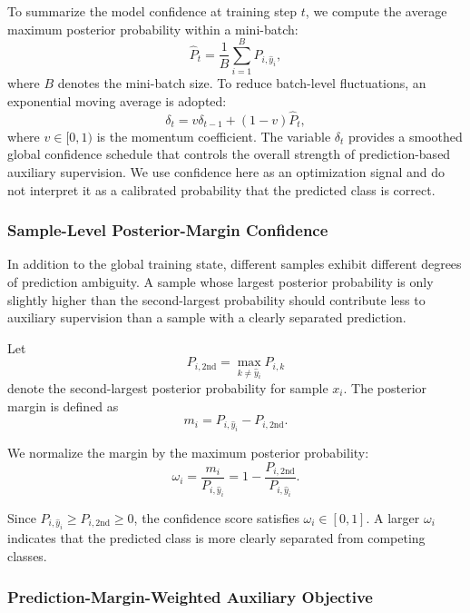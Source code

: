 \documentclass[journal]{IEEEtran}
\begin{document}
To summarize the model confidence at training step $t$, we compute the average maximum posterior probability within a mini-batch:
\begin{equation}
\hat{P}_t
=
\frac{1}{B}
\sum_{i=1}^{B}
P_{i,\hat{y}_i},
\end{equation}
where $B$ denotes the mini-batch size.
To reduce batch-level fluctuations, an exponential moving average is adopted:
\begin{equation}
\delta_t
=
v\delta_{t-1}
+
(1-v)\hat{P}_t,
\end{equation}
where $v\in[0,1)$ is the momentum coefficient.
The variable $\delta_t$ provides a smoothed global confidence schedule that controls the overall strength of prediction-based auxiliary supervision. We use confidence here as an optimization signal and do not interpret it as a calibrated probability that the predicted class is correct.

\subsubsection{Sample-Level Posterior-Margin Confidence}

In addition to the global training state, different samples exhibit different degrees of prediction ambiguity.
A sample whose largest posterior probability is only slightly higher than the second-largest probability should contribute less to auxiliary supervision than a sample with a clearly separated prediction.

Let
\begin{equation}
P_{i,\mathrm{2nd}}
=
\max_{k\neq\hat{y}_i}P_{i,k}
\end{equation}
denote the second-largest posterior probability for sample $x_i$.
The posterior margin is defined as
\begin{equation}
m_i
=
P_{i,\hat{y}_i}
-
P_{i,\mathrm{2nd}}.
\end{equation}

We normalize the margin by the maximum posterior probability:
\begin{equation}
\omega_i
=
\frac{m_i}{P_{i,\hat{y}_i}}
=
1-
\frac{P_{i,\mathrm{2nd}}}{P_{i,\hat{y}_i}}.
\end{equation}

Since $P_{i,\hat{y}_i}\geq P_{i,\mathrm{2nd}}\geq 0$, the confidence score satisfies $\omega_i\in[0,1]$.
A larger $\omega_i$ indicates that the predicted class is more clearly separated from competing classes.

\subsubsection{Prediction-Margin-Weighted Auxiliary Objective}
\end{document}
